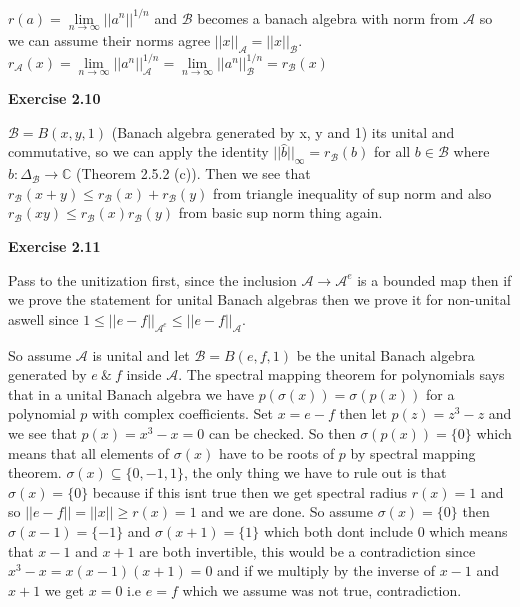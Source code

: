 \documentclass{article}
\begin{document}
$r(a) = \lim\limits_{n \rightarrow \infty} ||a^n||^{1/n}$ and $\mathcal B$ becomes a banach algebra with norm from $\mathcal A$ so we can assume their norms agree $|| x||_\mathcal A = ||x||_\mathcal B$. $r_\mathcal A(x) = \lim\limits_{n \rightarrow \infty} ||a^n||_\mathcal A^{1/n} = \lim\limits_{n \rightarrow \infty} ||a^n||_\mathcal B^{1/n} = r_\mathcal B(x)$

\vspace{0.5cm}

\textbf{Exercise 2.10}

\vspace{0.5cm}

$\mathcal B = B(x,y,1)$ (Banach algebra generated by x, y and 1) its unital and commutative, so we can apply the identity $||\hat b||_\infty = r_\mathcal{B}(b)$ for all $b \in \mathcal B$ where $\hat b : \Delta_{\mathcal B} \rightarrow \mathbb{C}$ (Theorem 2.5.2 (c)). Then we see that $r_\mathcal B(x+y) \leq r_\mathcal B(x) + r_\mathcal B(y)$ from triangle inequality of sup norm and also $r_\mathcal B(xy) \leq r_\mathcal B(x)r_\mathcal B(y)$ from basic sup norm thing again.

\vspace{0.5cm}

\textbf{Exercise 2.11}

\vspace{0.5cm}

Pass to the unitization first, since the inclusion $\mathcal A \rightarrow \mathcal  A^e$ is a bounded map then if we prove the statement for unital Banach algebras then we prove it for non-unital aswell since $1 \leq ||e-f||_{\mathcal A^e} \leq ||e-f||_\mathcal A$. 

So assume $\mathcal A$ is unital and let $\mathcal B =B(e,f,1)$ be the unital Banach algebra generated by $e \ \& \ f$ inside $\mathcal A$. The spectral mapping theorem for polynomials says that in a unital Banach algebra we have $p(\sigma(x)) = \sigma(p(x))$ for a polynomial $p$ with complex coefficients. Set $x = e-f$ then let $p(z) = z^3 - z$ and we see that $p(x) =x^3 - x = 0$ can be checked. So then $\sigma(p(x)) = \{0\}$ which means that all elements of $\sigma(x)$ have to be roots of $p$ by spectral mapping theorem. $\sigma(x) \subseteq \{0,-1,1\}$, the only thing we have to rule out is that $\sigma(x) = \{0\}$ because if this isnt true then we get spectral radius $r(x) = 1$ and so $||e-f|| = ||x|| \geq r(x) = 1$ and we are done. So assume $\sigma(x) = \{0\}$ then $\sigma(x-1) = \{-1\}$ and $\sigma(x+1) = \{1\}$ which both dont include $0$ which means that $x-1$ and $x+1$ are both invertible, this would be a contradiction since $x^3 - x = x(x-1)(x+1) = 0$ and if we multiply by the inverse of $x-1$ and $x+1$ we get $x = 0$ i.e $e = f$ which we assume was not true, contradiction.
\end{document}
